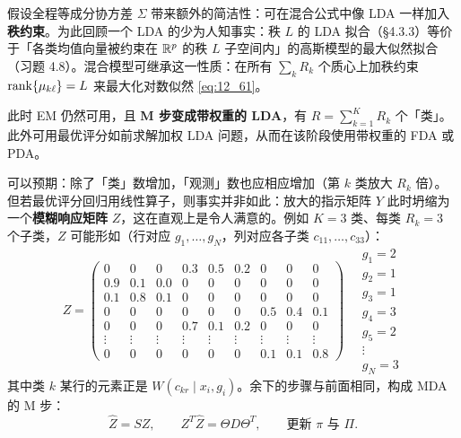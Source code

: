 \begin{remark}
假设全程等成分协方差 $\Sigma$ 带来额外的简洁性：可在混合公式中像 LDA 一样加入\textbf{秩约束}。为此回顾一个 LDA 的少为人知事实：秩 $L$ 的 LDA 拟合（§4.3.3）等价于「各类均值向量被约束在 $\mathbb{R}^p$ 的秩 $L$ 子空间内」的高斯模型的最大似然拟合（习题 4.8）。混合模型可继承这一性质：在所有 $\sum_k R_k$ 个质心上加秩约束 $\operatorname{rank}\{\mu_{k\ell}\}=L$ 来最大化对数似然 \ref{eq:12_61}。

此时 EM 仍然可用，且 \textbf{M 步变成带权重的 LDA}，有 $R=\sum_{k=1}^{K}R_k$ 个「类」。此外可用最优评分如前求解加权 LDA 问题，从而在该阶段使用带权重的 FDA 或 PDA。
\end{remark}

\begin{remark}[模糊响应矩阵 $Z$]
可以预期：除了「类」数增加，「观测」数也应相应增加（第 $k$ 类放大 $R_k$ 倍）。但若最优评分回归用线性算子，则事实并非如此：放大的指示矩阵 $Y$ 此时坍缩为一个\textbf{模糊响应矩阵} $Z$，这在直观上是令人满意的。例如 $K=3$ 类、每类 $R_k=3$ 个子类，$Z$ 可能形如（行对应 $g_1,\dots,g_N$，列对应各子类 $c_{11},\dots,c_{33}$）：
\begin{equation}
Z = \begin{pmatrix}
0 & 0 & 0 & 0.3 & 0.5 & 0.2 & 0 & 0 & 0\\
0.9 & 0.1 & 0.0 & 0 & 0 & 0 & 0 & 0 & 0\\
0.1 & 0.8 & 0.1 & 0 & 0 & 0 & 0 & 0 & 0\\
0 & 0 & 0 & 0 & 0 & 0 & 0.5 & 0.4 & 0.1\\
0 & 0 & 0 & 0.7 & 0.1 & 0.2 & 0 & 0 & 0\\
\vdots & \vdots & \vdots & \vdots & \vdots & \vdots & \vdots & \vdots & \vdots\\
0 & 0 & 0 & 0 & 0 & 0 & 0.1 & 0.1 & 0.8
\end{pmatrix} \quad
\begin{array}{l}
g_1=2\\ g_2=1\\ g_3=1\\ g_4=3\\ g_5=2\\ \vdots\\ g_N=3
\end{array} \label{eq:12_63}
\end{equation}
其中类 $k$ 某行的元素正是 $W(c_{kr}\mid x_i,g_i)$。余下的步骤与前面相同，构成 MDA 的 M 步：
\[
\hat Z = SZ, \qquad Z^T\hat Z = \Theta D \Theta^T, \qquad \text{更新 } \pi \text{ 与 } \Pi.
\]
\end{remark}

